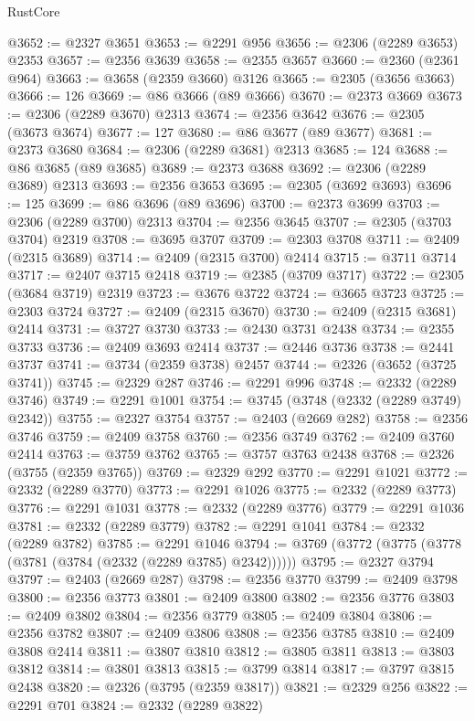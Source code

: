 \begin{lexlean}{RustCore}
\begin{coremodule}
@3652 := @2327 @3651
@3653 := @2291 @956
@3656 := @2306 (@2289 @3653) @2353
@3657 := @2356 @3639
@3658 := @2355 @3657
@3660 := @2360 (@2361 @964)
@3663 := @3658 (@2359 @3660) @3126
@3665 := @2305 (@3656 @3663)
@3666 := 126
@3669 := @86 @3666 (@89 @3666)
@3670 := @2373 @3669
@3673 := @2306 (@2289 @3670) @2313
@3674 := @2356 @3642
@3676 := @2305 (@3673 @3674)
@3677 := 127
@3680 := @86 @3677 (@89 @3677)
@3681 := @2373 @3680
@3684 := @2306 (@2289 @3681) @2313
@3685 := 124
@3688 := @86 @3685 (@89 @3685)
@3689 := @2373 @3688
@3692 := @2306 (@2289 @3689) @2313
@3693 := @2356 @3653
@3695 := @2305 (@3692 @3693)
@3696 := 125
@3699 := @86 @3696 (@89 @3696)
@3700 := @2373 @3699
@3703 := @2306 (@2289 @3700) @2313
@3704 := @2356 @3645
@3707 := @2305 (@3703 @3704) @2319
@3708 := @3695 @3707
@3709 := @2303 @3708
@3711 := @2409 (@2315 @3689)
@3714 := @2409 (@2315 @3700) @2414
@3715 := @3711 @3714
@3717 := @2407 @3715 @2418
@3719 := @2385 (@3709 @3717)
@3722 := @2305 (@3684 @3719) @2319
@3723 := @3676 @3722
@3724 := @3665 @3723
@3725 := @2303 @3724
@3727 := @2409 (@2315 @3670)
@3730 := @2409 (@2315 @3681) @2414
@3731 := @3727 @3730
@3733 := @2430 @3731 @2438
@3734 := @2355 @3733
@3736 := @2409 @3693 @2414
@3737 := @2446 @3736
@3738 := @2441 @3737
@3741 := @3734 (@2359 @3738) @2457
@3744 := @2326 (@3652 (@3725 @3741))
@3745 := @2329 @287
@3746 := @2291 @996
@3748 := @2332 (@2289 @3746)
@3749 := @2291 @1001
@3754 := @3745 (@3748 (@2332 (@2289 @3749) @2342))
@3755 := @2327 @3754
@3757 := @2403 (@2669 @282)
@3758 := @2356 @3746
@3759 := @2409 @3758
@3760 := @2356 @3749
@3762 := @2409 @3760 @2414
@3763 := @3759 @3762
@3765 := @3757 @3763 @2438
@3768 := @2326 (@3755 (@2359 @3765))
@3769 := @2329 @292
@3770 := @2291 @1021
@3772 := @2332 (@2289 @3770)
@3773 := @2291 @1026
@3775 := @2332 (@2289 @3773)
@3776 := @2291 @1031
@3778 := @2332 (@2289 @3776)
@3779 := @2291 @1036
@3781 := @2332 (@2289 @3779)
@3782 := @2291 @1041
@3784 := @2332 (@2289 @3782)
@3785 := @2291 @1046
@3794 := @3769 (@3772 (@3775 (@3778 (@3781 (@3784 (@2332 (@2289 @3785) @2342))))))
@3795 := @2327 @3794
@3797 := @2403 (@2669 @287)
@3798 := @2356 @3770
@3799 := @2409 @3798
@3800 := @2356 @3773
@3801 := @2409 @3800
@3802 := @2356 @3776
@3803 := @2409 @3802
@3804 := @2356 @3779
@3805 := @2409 @3804
@3806 := @2356 @3782
@3807 := @2409 @3806
@3808 := @2356 @3785
@3810 := @2409 @3808 @2414
@3811 := @3807 @3810
@3812 := @3805 @3811
@3813 := @3803 @3812
@3814 := @3801 @3813
@3815 := @3799 @3814
@3817 := @3797 @3815 @2438
@3820 := @2326 (@3795 (@2359 @3817))
@3821 := @2329 @256
@3822 := @2291 @701
@3824 := @2332 (@2289 @3822)

\end{coremodule}
\end{lexlean}
